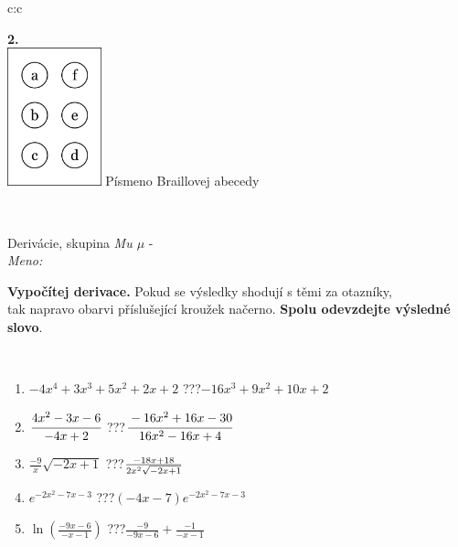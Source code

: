 \documentclass[10pt]{report}
\begin{document}
\begin{tabular}{c:c}
\begin{minipage}[c][104.5mm][t]{0.5\linewidth}
\begin{center}
\begin{minipage}{0.20\linewidth}
\begin{center}
{\Huge\bfseries 2.} \\[2mm]
\includegraphics[height=40mm]{../images/braille.png}
{\small Písmeno Braillovej abecedy}
\end{center}
\end{minipage}
\end{center}
\end{minipage}
\\ \hdashline
\begin{minipage}[c][104.5mm][t]{0.5\linewidth}
\begin{center}
\vspace{7mm}
{\huge Derivácie, skupina \textit{Mu $\mu$} -}\\[5mm]
\textit{Meno:}\phantom{xxxxxxxxxxxxxxxxxxxxxxxxxxxxxxxxxxxxxxxxxxxxxxxxxxxxxxxxxxxxxxxxx}\\[5mm]
\begin{minipage}{0.95\linewidth}
\begin{center}
\textbf{Vypočítej derivace.} Pokud se výsledky shodují s těmi za otazníky,\\tak napravo obarvi příslušející kroužek načerno. \textbf{Spolu odevzdejte výsledné slovo}.
\end{center}
\end{minipage}
\\[1mm]
\begin{minipage}{0.79\linewidth}
\begin{center}
\begin{varwidth}{\linewidth}
\begin{enumerate}
\normalsize
\item $-4x^4+3x^3+5x^2+2x+2$\quad \dotfill\; ???\;\dotfill \quad $-16x^3+9x^2+10x+2$
\item $\cfrac{4x^2-3x-6}{-4x+2}$\quad \dotfill\; ???\;\dotfill \quad $\cfrac{-16x^2+16x-30}{16x^2-16x+4}$
\item $\frac{-9}{x}\sqrt{-2x+1}$\quad \dotfill\; ???\;\dotfill \quad $\frac{-18x+18}{2x^2 \sqrt{\smash[b]{-2x+1}}}$
\item $e^{-2x^2-7x-3}$\quad \dotfill\; ???\;\dotfill \quad $(-4x-7)e^{-2x^2-7x-3}$
\item $\ln{\left(\frac{-9x-6}{-x-1}\right)}$\quad \dotfill\; ???\;\dotfill \quad $\frac{-9}{-9x-6}+\frac{-1}{-x-1}$

\end{enumerate}
\end{varwidth}
\end{center}
\end{minipage}
\end{center}
\end{minipage}
\end{tabular}
\end{document}
